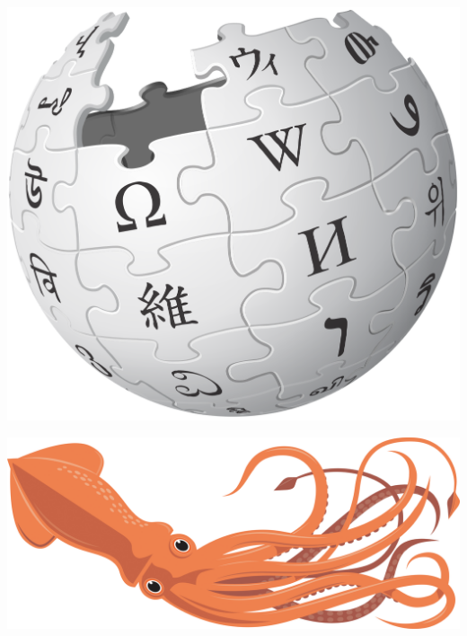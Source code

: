 \documentclass[t,xcolor={svgnames}]{beamer}
\begin{document}
\begin{frame}
\vfill
\begin{center}
  \begin{minipage}{.2\textwidth}\includegraphics[width=\textwidth]{wikipedia.png}\end{minipage}
  \begin{minipage}{.2\textwidth}\includegraphics[width=\textwidth]{squid.jpg}\end{minipage}
\end{center}

\end{frame}
\end{document}
